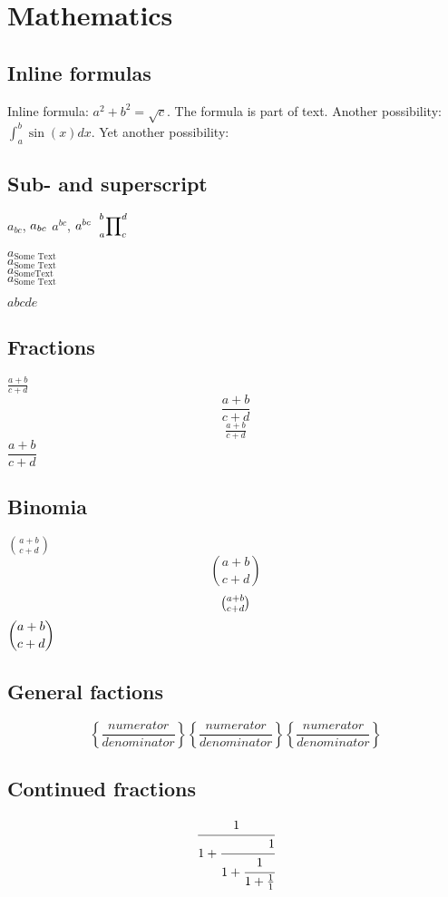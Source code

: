 \documentclass[a4paper]{article}
\begin{document}
    \section{Mathematics}
    \subsection{Inline formulas}
    Inline formula:
    $a^2+b^2=\sqrt{c}$. The formula is part of text. Another possibility: 
    \(\int_a^b\sin(x)dx\). Yet another possibility:

    \subsection{Sub- and superscript}
    $a_{bc}$, $a\sb{bc}$
    $a^{bc}$, $a\sp{bc}$
    $\sideset{_a^b}{_c^d}\prod$

    $a_{\text{Some Text}}$\\
    $a_{\mbox{Some Text}}$\\
    $a_{\mathrm{Some Text}}$\\
    $a_{\textrm{Some Text}}$

    $a b c d e$


    \subsection{Fractions}

    $\frac{a+b}{c+d}$
    $$\frac{a+b}{c+d}$$
    $$\tfrac{a+b}{c+d}$$
    $\dfrac{a+b}{c+d}$

    \subsection{Binomia}

    $\binom{a+b}{c+d}$
    $$\binom{a+b}{c+d}$$
    $$\tbinom{a+b}{c+d}$$
    $\dbinom{a+b}{c+d}$

    \subsection{General factions}
    \[
    \genfrac{\{}{\}}{2mm}{1}{numerator}{denominator}
    \genfrac{\{}{\}}{1dd}{1}{numerator}{denominator}
    \genfrac{\{}{\}}{1dd}{0}{numerator}{denominator}
    \]

    \subsection{Continued fractions}
    \[
    \cfrac[1]{1}{1+\cfrac[r]{1}{1+\cfrac{1}{1+\frac{1}{1}}}}
    \]
\end{document}
